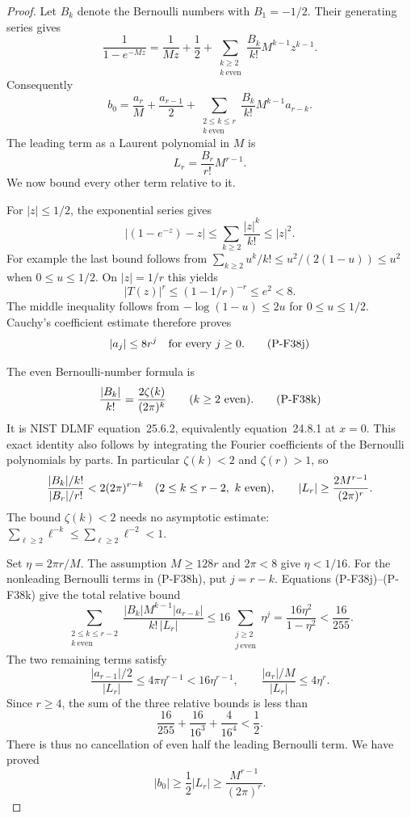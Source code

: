 \begin{proof}
Let $B_k$ denote the Bernoulli numbers with $B_1=-1/2$.
Their generating series gives
\[
 \frac1{1-e^{-Mz}}
 =\frac1{Mz}+\frac12+
      \sum_{\substack{k\ge2\\ k\ \mathrm{even}}}
                     \frac{B_k}{k!}M^{k-1}z^{k-1}.
\]
Consequently
\[
 b_0=\frac{a_r}{M}+\frac{a_{r-1}}2
       +\sum_{\substack{2\le k\le r\\ k\ \mathrm{even}}}
                 \frac{B_k}{k!}M^{k-1}a_{r-k}.
 \tag{P-F38h}
\]
The leading term as a Laurent polynomial in $M$ is
\[
             L_r=\frac{B_r}{r!}M^{r-1}.
 \tag{P-F38i}
\]
We now bound every other term relative to it.

For $|z|\le1/2$, the exponential series gives
\[
 |(1-e^{-z})-z|
       \le\sum_{k\ge2}\frac{|z|^k}{k!}\le |z|^2.
\]
For example the last bound follows from
$\sum_{k\ge2}u^k/k!\le u^2/(2(1-u))\le u^2$
when $0\le u\le1/2$.
On $|z|=1/r$ this yields
\[
 |T(z)|^r\le(1-1/r)^{-r}\le e^2<8.
\]
The middle inequality follows from
$-\log(1-u)\le2u$ for $0\le u\le1/2$.
Cauchy's coefficient estimate therefore proves
\[
                         |a_j|\le8r^j
                         \quad\hbox{for every }j\ge0.
 \tag{P-F38j}
\]

The even Bernoulli-number formula is
\[
 \frac{|B_k|}{k!}=\frac{2\zeta(k)}{(2\pi)^k}
           \qquad(k\ge2\ \hbox{even}).
 \tag{P-F38k}
\]
It is NIST DLMF equation~25.6.2, equivalently equation~24.8.1
at $x=0$. This exact identity also follows by integrating the
Fourier coefficients of the Bernoulli polynomials by parts.
In particular $\zeta(k)<2$ and $\zeta(r)>1$, so
\[
 \frac{|B_k|/k!}{|B_r|/r!}<2(2\pi)^{r-k}
        \quad(2\le k\le r-2,\ k\ \hbox{even}),\qquad
 |L_r|\ge\frac{2M^{r-1}}{(2\pi)^r}.
\]
The bound $\zeta(k)<2$ needs no asymptotic estimate:
$\sum_{\ell\ge2}\ell^{-k}\le\sum_{\ell\ge2}\ell^{-2}<1$.

Set $\eta=2\pi r/M$. The assumption $M\ge128r$ and
$2\pi<8$ give $\eta<1/16$. For the nonleading Bernoulli
terms in (P-F38h), put $j=r-k$. Equations (P-F38j)--(P-F38k)
give the total relative bound
\[
 \sum_{\substack{2\le k\le r-2\\ k\ \mathrm{even}}}
 \frac{|B_k|M^{k-1}|a_{r-k}|}{k!\,|L_r|}
       \le16\sum_{\substack{j\ge2\\ j\ \mathrm{even}}}\eta^j
       =\frac{16\eta^2}{1-\eta^2}
       <\frac{16}{255}.
 \tag{P-F38l}
\]
The two remaining terms satisfy
\[
 \frac{|a_{r-1}|/2}{|L_r|}
        \le4\pi\eta^{r-1}<16\eta^{r-1},
 \qquad
 \frac{|a_r|/M}{|L_r|}\le4\eta^r.
 \tag{P-F38m}
\]
Since $r\ge4$, the sum of the three relative bounds is
less than
\[
        \frac{16}{255}+\frac{16}{16^3}
                          +\frac4{16^4}<\frac12.
\]
There is thus no cancellation of even half the leading
Bernoulli term. We have proved
\[
              |b_0|\ge\frac12|L_r|
                         \ge\frac{M^{r-1}}{(2\pi)^r}.
 \tag{P-F38n}
\]


\end{proof}
